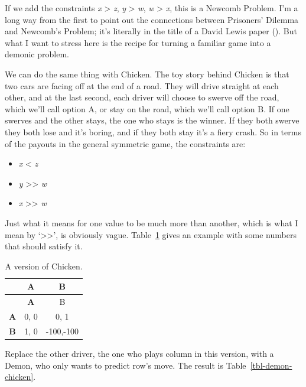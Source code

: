 \documentclass[
  12pt,
  letterpaper,
  DIV=11,
  numbers=noendperiod]{scrreprt}
\providecommand{\tightlist}{%
  \setlength{\itemsep}{0pt}\setlength{\parskip}{0pt}}\usepackage{longtable,booktabs,array}
\begin{document}
If we add the constraints \emph{x} \textgreater{} \emph{z}, \emph{y}
\textgreater{} \emph{w}, \emph{w} \textgreater{} \emph{x}, this is a
Newcomb Problem. I'm a long way from the first to point out the
connections between Prisoners' Dilemma and Newcomb's Problem; it's
literally in the title of a David Lewis paper
(). But what I want to stress here
is the recipe for turning a familiar game into a demonic problem.

We can do the same thing with Chicken. The toy story behind Chicken is
that two cars are facing off at the end of a road. They will drive
straight at each other, and at the last second, each driver will choose
to swerve off the road, which we'll call option A, or stay on the road,
which we'll call option B. If one swerves and the other stays, the one
who stays is the winner. If they both swerve they both lose and it's
boring, and if they both stay it's a fiery crash. So in terms of the
payouts in the general symmetric game, the constraints are:

\begin{itemize}
\tightlist
\item
  \emph{x} \textless{} \emph{z}
\item
  \emph{y} \textgreater\textgreater{} \emph{w}
\item
  \emph{x} \textgreater\textgreater{} \emph{w}
\end{itemize}

Just what it means for one value to be much more than another, which is
what I mean by `\textgreater\textgreater{}', is obviously vague.
Table~\ref{tbl-basic-chicken} gives an example with some numbers that
should satisfy it.

\begin{longtable}[]{@{}ccc@{}}
\caption{A version of Chicken.}\label{tbl-basic-chicken}\tabularnewline
\toprule\noalign{}
& \textbf{A} & B \\
\midrule\noalign{}
\endfirsthead
\toprule\noalign{}
& \textbf{A} & B \\
\midrule\noalign{}
\endhead
\bottomrule\noalign{}
\endlastfoot
\textbf{A} & 0, 0 & 0, 1 \\
\textbf{B} & 1, 0 & -100,-100 \\
\end{longtable}

Replace the other driver, the one who plays column in this version, with
a Demon, who only wants to predict row's move. The result is
Table~\ref{tbl-demon-chicken}.
\end{document}
